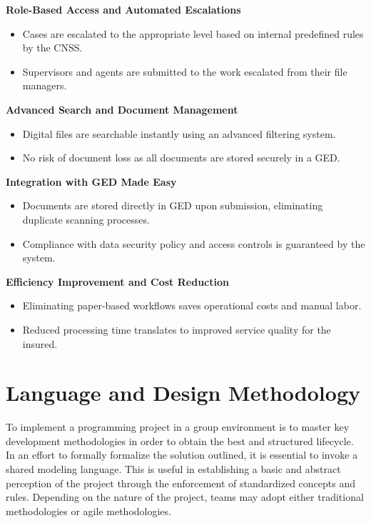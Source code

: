 \textbf{ Role-Based Access and Automated Escalations}
\begin{itemize}
    \item Cases are  escalated to the appropriate level based on internal predefined rules by the CNSS.
    \item Supervisors and agents are submitted to the work escalated from their file managers.
\end{itemize}

 \textbf{ Advanced Search and Document Management}
\begin{itemize}
    \item Digital files are searchable instantly using an advanced filtering system.
    \item No risk of document loss as all documents are stored securely in a GED. 
\end{itemize}

\textbf{ Integration with GED Made Easy}
\begin{itemize}
\item Documents are stored directly in GED upon submission, eliminating duplicate scanning processes.
\item Compliance with data security policy and access controls is guaranteed by the system.
\end{itemize}

 \textbf{ Efficiency Improvement and Cost Reduction}
\begin{itemize}
    \item Eliminating paper-based workflows saves operational costs and manual labor.
    \item Reduced processing time translates to improved service quality for the insured.
\end{itemize}

\section{Language and Design Methodology}

To implement a programming project in a group environment is to master key development methodologies in order to obtain the best and structured lifecycle.
In an effort to formally formalize the solution outlined, it is essential to invoke a shared modeling language. This is useful in establishing a basic and abstract perception of the project through the enforcement of standardized concepts and rules.
Depending on the nature of the project, teams may adopt either traditional methodologies or agile methodologies.

